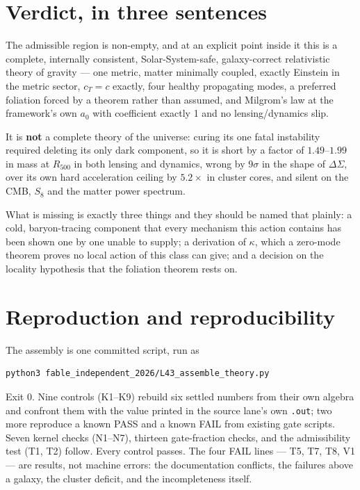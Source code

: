 \documentclass[11pt,letterpaper]{article}
\begin{document}
\section{Verdict, in three sentences}
The admissible region is non-empty, and at an explicit point inside it this is a complete, internally consistent, Solar-System-safe, galaxy-correct relativistic theory of gravity --- one metric, matter minimally coupled, exactly Einstein in the metric sector, $c_T=c$ exactly, four healthy propagating modes, a preferred foliation forced by a theorem rather than assumed, and Milgrom's law at the framework's own $a_0$ with coefficient exactly 1 and no lensing/dynamics slip.

It is \textbf{not} a complete theory of the universe: curing its one fatal instability required deleting its only dark component, so it is short by a factor of $1.49$--$1.99$ in mass at $R_{500}$ in both lensing and dynamics, wrong by $9\sigma$ in the shape of $\Delta\Sigma$, over its own hard acceleration ceiling by $5.2\times$ in cluster cores, and silent on the CMB, $S_8$ and the matter power spectrum.

What is missing is exactly three things and they should be named that plainly: a cold, baryon-tracing component that every mechanism this action contains has been shown one by one unable to supply; a derivation of $\kappa$, which a zero-mode theorem proves no local action of this class can give; and a decision on the locality hypothesis that the foliation theorem rests on.

\section*{Reproduction and reproducibility}
The assembly is one committed script, run as
\begin{verbatim}
python3 fable_independent_2026/L43_assemble_theory.py
\end{verbatim}
Exit 0. Nine controls (K1--K9) rebuild six settled numbers from their own algebra and confront them with the value printed in the source lane's own \texttt{.out}; two more reproduce a known PASS and a known FAIL from existing gate scripts. Seven kernel checks (N1--N7), thirteen gate-fraction checks, and the admissibility test (T1, T2) follow. Every control passes. The four FAIL lines --- T5, T7, T8, V1 --- are results, not machine errors: the documentation conflicts, the failures above a galaxy, the cluster deficit, and the incompleteness itself.
\end{document}
